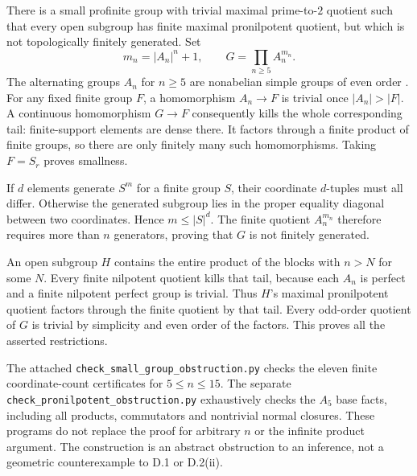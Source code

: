 \begin{example}
\label{D:pronilpotent-obstruction}
There is a small profinite group with trivial maximal
prime-to-$2$ quotient such that every open subgroup has
finite maximal pronilpotent quotient, but which is not
topologically finitely generated. Set
\[
 m_n=|A_n|^n+1,\qquad
 G=\prod_{n\geq5}A_n^{m_n}.
\]
The alternating groups $A_n$ for $n\geq5$ are nonabelian
simple groups of even order
\cite[Theorem 1.1, p.~1, with proofs in sections 3--7]{ConradAnD}.
For any fixed finite group $F$, a homomorphism $A_n\to F$
is trivial once $|A_n|>|F|$. A continuous homomorphism
$G\to F$ consequently kills the whole corresponding tail:
finite-support elements are dense there. It factors through
a finite product of finite groups, so there are only finitely
many such homomorphisms. Taking $F=S_r$ proves smallness.

If $d$ elements generate $S^m$ for a finite group $S$,
their coordinate $d$-tuples must all differ. Otherwise the
generated subgroup lies in the proper equality diagonal
between two coordinates. Hence $m\leq |S|^d$.
The finite quotient $A_n^{m_n}$ therefore requires more
than $n$ generators, proving that $G$ is not finitely generated.

An open subgroup $H$ contains the entire product of the
blocks with $n>N$ for some $N$. Every finite nilpotent
quotient kills that tail, because each $A_n$ is perfect
and a finite nilpotent perfect group is trivial. Thus
$H$'s maximal pronilpotent quotient factors through the
finite quotient by that tail. Every odd-order quotient
of $G$ is trivial by simplicity and even order of the
factors. This proves all the asserted restrictions.

The attached \texttt{check\_small\_group\_obstruction.py}
checks the eleven finite coordinate-count certificates
for $5\leq n\leq15$. The separate
\texttt{check\_pronilpotent\_obstruction.py} exhaustively
checks the $A_5$ base facts, including all products,
commutators and nontrivial normal closures. These programs
do not replace the proof for arbitrary $n$ or the infinite
product argument. The construction is an abstract obstruction
to an inference, not a geometric counterexample to D.1 or D.2(ii).
\end{example}

